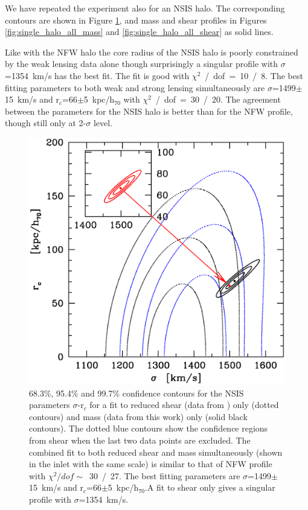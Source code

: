 \documentclass[useAMS,usenatbib]{mn2e}
\newcounter{one}   \setcounter{one}{1}
\newcounter{two}   \setcounter{two}{2}
\begin{document}
We have repeated the experiment also for an NSIS halo. The
corresponding contours are shown in Figure
\ref{fig:single_halo_nsis_all}, and mass and shear profiles in Figures
\ref{fig:single_halo_all_mass} and \ref{fig:single_halo_all_shear} as
solid lines.

Like with the NFW halo the core radius of the NSIS halo is poorly
constrained by the weak lensing data alone though surprisingly a
singular profile with $\sigma$=1354~km/s has the best fit. The fit is
good with $\chi^2$~/~dof~=~10~/~8. The best fitting parameters to both
weak and strong lensing simultaneously are $\sigma$=1499$\pm$15~km/s
and r$_c$=66$\pm$5~kpc/h$_{70}$ with $\chi^2$~/~dof~=~30~/~20. The
agreement between the parameters for the NSIS halo is better than for
the NFW profile, though still only at 2-$\sigma$ level.

\begin{figure}
  \centering
  \includegraphics[width=\columnwidth]{figs/single_nsis_gbbs_both_lin_chi2.ps}
  \caption{68.3\%, 95.4\% and 99.7\% confidence contours for the NSIS
  parameters $\sigma$-r$_c$ for a fit to reduced shear (data from
  \citet{broadhurst:05b}) only (dotted contours) and mass (data from
  this work) only (solid black contours). The dotted blue contours
  show the confidence regions from shear when the last two data points
  are excluded. The combined fit to both reduced shear and mass
  simultaneously (shown in the inlet with the same scale) is similar
  to that of NFW profile with $\chi^2/dof\sim$~30~/~27. The best
  fitting parameters are $\sigma$=1499$\pm$15~km/s and
  r$_c$=66$\pm$5~kpc/h$_{70}$.A fit to shear only gives a singular
  profile with $\sigma$=1354~km/s.}
  \label{fig:single_halo_nsis_all}
\end{figure}
\end{document}

